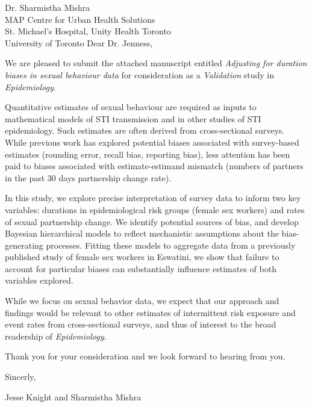 \address{
  Dr. Samuel Jenness\\
  Editor\\
  Epidemiology
}{Dr. Sharmistha Mishra\\
  MAP Centre for Urban Health Solutions\\
  St. Michael's Hospital, Unity Health Toronto\\
  University of Toronto}
Dear Dr. Jenness,
\par
We are pleased to submit the attached manuscript entitled
\emph{Adjusting for duration biases in sexual behaviour data}
for consideration as a \emph{Validation} study in \emph{Epidemiology}.
\par
Quantitative estimates of sexual behaviour are required  %
as inputs to mathematical models of STI transmission and in other studies of STI epidemiology.
Such estimates are often derived from cross-sectional surveys.
While previous work has explored potential biases associated with survey-based estimates
(\eg rounding error, recall bias, reporting bias),
less attention has been paid to biases associated with estimate-estimand mismatch  %
(\eg numbers of partners in the past 30 days \vs partnership change rate).
\par
In this study, we explore precise interpretation of survey data to inform two key variables:  %
durations in epidemiological risk groups (\eg female sex workers) and
rates of sexual partnership change.
We identify potential sources of bias,
and develop Bayesian hierarchical models to reflect
mechanistic assumptions about the bias-generating processes.
Fitting these models to aggregate data from
a previously published study of female sex workers in Eswatini,
we show that failure to account for particular biases can
substantially influence estimates of both variables explored.
\par
While we focus on sexual behavior data,
we expect that our approach and findings would be relevant to
other estimates of intermittent risk exposure and event rates from cross-sectional surveys,  %
and thus of interest to the broad readership of \emph{Epidemiology}.
\par
Thank you for your consideration and we look forward to hearing from you.
\medskip\par
Sincerly,
\par
Jesse Knight and Sharmistha Mishra